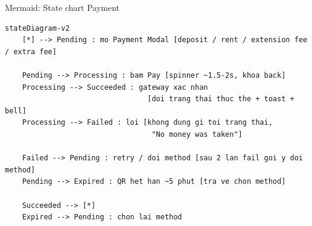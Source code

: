 \documentclass[12pt,a4paper]{article}
\renewcommand{\_}{\textunderscore\allowbreak}
\begin{document}
\begin{mermaidbox}{Mermaid: State chart Payment}
\begin{Verbatim}[fontsize=\small]
%% StorageHub - State chart: vong doi Payment (mock gateway, 4 touchpoint)
stateDiagram-v2
    [*] --> Pending : mo Payment Modal [deposit / rent / extension fee / extra fee]

    Pending --> Processing : bam Pay [spinner ~1.5-2s, khoa back]
    Processing --> Succeeded : gateway xac nhan
                                 [doi trang thai thuc the + toast + bell]
    Processing --> Failed : loi [khong dung gi toi trang thai,
                                  "No money was taken"]

    Failed --> Pending : retry / doi method [sau 2 lan fail goi y doi method]
    Pending --> Expired : QR het han ~5 phut [tra ve chon method]

    Succeeded --> [*]
    Expired --> Pending : chon lai method
\end{Verbatim}
\end{mermaidbox}
\end{document}
